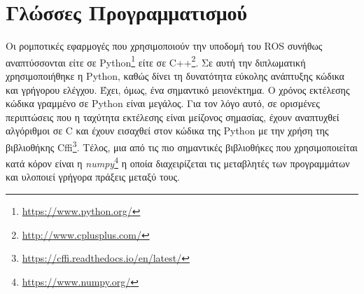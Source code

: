 \section{Γλώσσες Προγραμματισμού}
\label{section:software}

Οι ρομποτικές εφαρμογές που χρησιμοποιούν την υποδομή του ROS συνήθως αναπτύσσονται είτε σε Python\footnote{\href{https://www.python.org/}{https://www.python.org/}} είτε σε C++\footnote{\href{http://www.cplusplus.com/}{http://www.cplusplus.com/}}. Σε αυτή την διπλωματική χρησιμοποιήθηκε η Python, καθώς δίνει τη δυνατότητα εύκολης ανάπτυξης κώδικα και γρήγορου ελέγχου. Έχει, όμως, ένα σημαντικό μειονέκτημα. Ο χρόνος εκτέλεσης κώδικα γραμμένο σε Python είναι μεγάλος. Για τον λόγο αυτό, σε ορισμένες περιπτώσεις που η ταχύτητα εκτέλεσης είναι μείζονος σημασίας, έχουν αναπτυχθεί αλγόριθμοι σε C και έχουν εισαχθεί στον κώδικα της Python με την χρήση της βιβλιοθήκης Cffi\footnote{\href{https://cffi.readthedocs.io/en/latest/}{https://cffi.readthedocs.io/en/latest/}}. Τέλος, μια από τις πιο σημαντικές βιβλιοθήκες που χρησιμοποιείται κατά κόρον είναι η \emph{numpy}\footnote{\href{https://www.numpy.org/}{https://www.numpy.org/}} η οποία διαχειρίζεται τις μεταβλητές των προγραμμάτων και υλοποιεί γρήγορα πράξεις μεταξύ τους.


